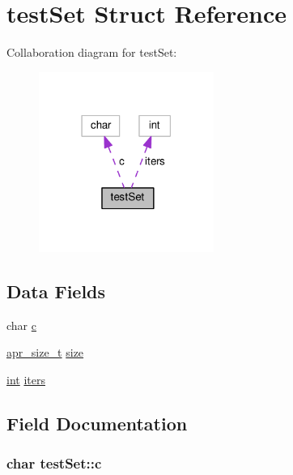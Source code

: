 \hypertarget{structtestSet}{}\section{test\+Set Struct Reference}
\label{structtestSet}


Collaboration diagram for test\+Set\+:
\nopagebreak
\begin{figure}[H]
\begin{center}
\leavevmode
\includegraphics[width=162pt]{structtestSet__coll__graph}
\end{center}
\end{figure}
\subsection*{Data Fields}
\begin{DoxyCompactItemize}
\item 
char \hyperlink{structtestSet_a3339d618344616af26f2004f8f232125}{c}
\item 
\hyperlink{group__apr__platform_gaaa72b2253f6f3032cefea5712a27540e}{apr\+\_\+size\+\_\+t} \hyperlink{structtestSet_a3fd1a4c68f1cb020f0652534b07c25dd}{size}
\item 
\hyperlink{pcre_8txt_a42dfa4ff673c82d8efe7144098fbc198}{int} \hyperlink{structtestSet_a90ed3645019efebf0ec6ffc7bb69e9eb}{iters}
\end{DoxyCompactItemize}


\subsection{Field Documentation}
\subsubsection[{\texorpdfstring{c}{c}}]{\setlength{\rightskip}{0pt plus 5cm}char test\+Set\+::c}\hypertarget{structtestSet_a3339d618344616af26f2004f8f232125}{}\label{structtestSet_a3339d618344616af26f2004f8f232125}
